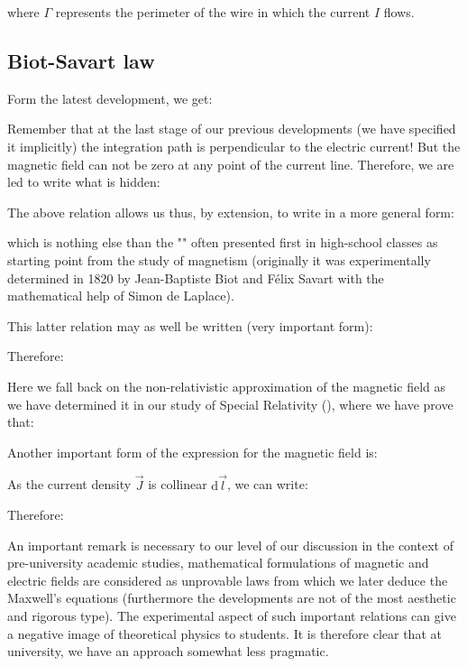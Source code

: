 	where $\Gamma$ represents the perimeter of the wire in which the current $I$ flows.
	
	\subsection{Biot-Savart law}\label{biot savart law}
	Form the latest development, we get:
	
	Remember that at the last stage of our previous developments (we have specified it implicitly) the integration path is perpendicular to the electric current! But the magnetic field can not be zero at any point of the current line. Therefore, we are led to write what is hidden:
	
	The above relation allows us thus, by extension, to write in a more general form:
	 
	which is nothing else than the "" often presented first in high-school classes as starting point from the study of magnetism (originally it was experimentally determined in 1820 by Jean-Baptiste Biot and Félix Savart with the mathematical help of Simon de Laplace).
	
	This latter relation may as well be written (very important form):
	
	Therefore:
	
	Here we fall back on the non-relativistic approximation of the magnetic field as we have determined it in our study of Special Relativity (), where we have prove that:
	
	Another important form of the expression for the magnetic field is:
	
	As the current density $\vec{J}$ is collinear $\mathrm{d}\vec{l}$, we can write:
	
	Therefore:
	
	An important remark is necessary to our level of our discussion in the context of pre-university academic studies, mathematical formulations of magnetic and electric fields are considered as unprovable laws from which we later deduce the Maxwell's equations (furthermore the developments are not of the most aesthetic and rigorous type). The experimental aspect of such important relations can give a negative image of theoretical physics to students. It is therefore clear that at university, we have an approach somewhat less pragmatic.
	
